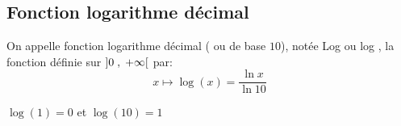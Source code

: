 \subsection{Fonction logarithme décimal}
\begin{definition}
On appelle fonction logarithme décimal ( ou  de base $ 10 $), notée Log ou log , la  fonction définie  sur $ \left]0 \;,\; +\infty\right[ $ par: $$ x  \longmapsto \log(x)=\dfrac{\ln x}{\ln 10} $$
\end{definition}


\begin{remark}
$ \log(1)=0 $ et $ \log(10)=1 $

\end{remark}

 

